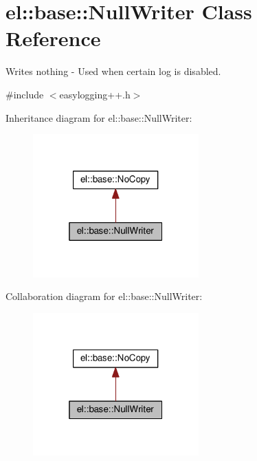 \hypertarget{classel_1_1base_1_1_null_writer}{}\section{el\+:\+:base\+:\+:Null\+Writer Class Reference}
\label{classel_1_1base_1_1_null_writer}


Writes nothing -\/ Used when certain log is disabled.  




{\ttfamily \#include $<$easylogging++.\+h$>$}



Inheritance diagram for el\+:\+:base\+:\+:Null\+Writer\+:
\nopagebreak
\begin{figure}[H]
\begin{center}
\leavevmode
\includegraphics[width=181pt]{classel_1_1base_1_1_null_writer__inherit__graph}
\end{center}
\end{figure}


Collaboration diagram for el\+:\+:base\+:\+:Null\+Writer\+:
\nopagebreak
\begin{figure}[H]
\begin{center}
\leavevmode
\includegraphics[width=181pt]{classel_1_1base_1_1_null_writer__coll__graph}
\end{center}
\end{figure}
